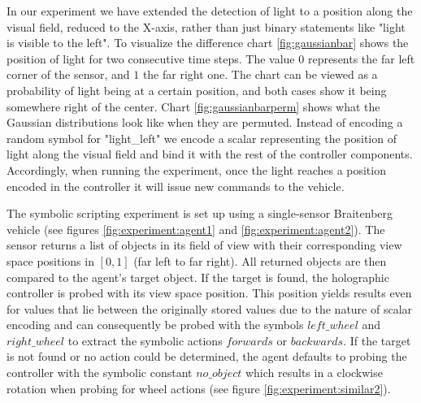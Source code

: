 \documentclass[a4paper,twoside]{article}
\begin{document}
	In our experiment we have extended the detection of light to a position along the visual field, reduced to the X-axis, rather than just binary statements like "light is visible to the left". To visualize the difference chart \ref{fig:gaussianbar} shows the position of light for two consecutive time steps. The value $0$ represents the far left corner of the sensor, and $1$ the far right one. The chart can be viewed as a probability of light being at a certain position, and both cases show it being somewhere right of the center. Chart \ref{fig:gaussianbarperm} shows what the Gaussian distributions look like when they are permuted. Instead of encoding a random symbol for "light\_left" we encode a scalar representing the position of light along the visual field and bind it with the rest of the controller components. Accordingly, when running the experiment, once the light reaches a position encoded in the controller it will issue new commands to the vehicle.

The symbolic scripting experiment is set up using a single-sensor Braitenberg
vehicle (see figures \ref{fig:experiment:agent1} and
\ref{fig:experiment:agent2}).
The sensor returns a list of objects in its field of view with their
corresponding view space positions in $[0,1]$ (far left to far right).
All returned objects are then compared to the agent's target object.
If the target is found, the holographic controller is probed with its view space
position. This position yields results even for
values that lie between the originally stored values due to the nature of scalar encoding and can consequently be
probed with the symbols $left\_wheel$ and $right\_wheel$ to extract the symbolic
actions $forwards$ or $backwards$.
If the target is not found or no action could be determined, the agent defaults
to probing the controller with the symbolic constant $no\_object$ which results in
a clockwise rotation when probing for wheel actions (see figure
\ref{fig:experiment:similar2}).
\end{document}
